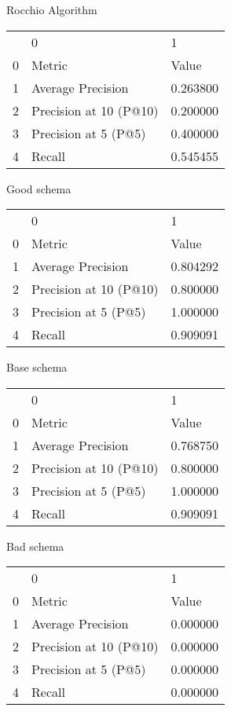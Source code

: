 

Rocchio Algorithm
\begin{tabular}{lll}
 & 0 & 1 \\
0 & Metric & Value \\
1 & Average Precision & 0.263800 \\
2 & Precision at 10 (P@10) & 0.200000 \\
3 & Precision at 5 (P@5) & 0.400000 \\
4 & Recall & 0.545455 \\
\end{tabular}


Good schema
\begin{tabular}{lll}
 & 0 & 1 \\
0 & Metric & Value \\
1 & Average Precision & 0.804292 \\
2 & Precision at 10 (P@10) & 0.800000 \\
3 & Precision at 5 (P@5) & 1.000000 \\
4 & Recall & 0.909091 \\
\end{tabular}


Base schema
\begin{tabular}{lll}
 & 0 & 1 \\
0 & Metric & Value \\
1 & Average Precision & 0.768750 \\
2 & Precision at 10 (P@10) & 0.800000 \\
3 & Precision at 5 (P@5) & 1.000000 \\
4 & Recall & 0.909091 \\
\end{tabular}


Bad schema
\begin{tabular}{lll}
 & 0 & 1 \\
0 & Metric & Value \\
1 & Average Precision & 0.000000 \\
2 & Precision at 10 (P@10) & 0.000000 \\
3 & Precision at 5 (P@5) & 0.000000 \\
4 & Recall & 0.000000 \\
\end{tabular}
